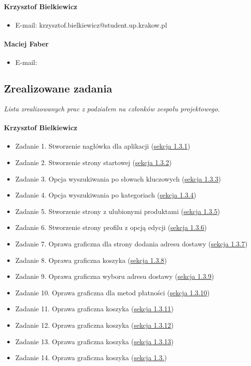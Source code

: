 \documentclass[12pt,a4paper,oneside]{article}
\theoremstyle{definition}
\numberwithin{equation}{section}
\begin{document}
    \paragraph{Krzysztof Bielkiewicz}
    \begin{itemize}
        \item E-mail:  krzysztof.bielkiewicz@student.up.krakow.pl
    \end{itemize}
    \paragraph{Maciej Faber}
    \begin{itemize}
        \item E-mail:
    \end{itemize}

\subsection{Zrealizowane zadania}
\textit{Lista zrealizowanych prac z podziałem na członków zespołu projektowego.}
\paragraph{Krzysztof Bielkiewicz}
\begin{itemize}
\item Zadanie 1. Stworzenie nagłówka dla aplikacji (\hyperref[1.3.1]{sekcja 1.3.1})
\item Zadanie 2. Stworzenie strony startowej (\hyperref[1.3.2]{sekcja 1.3.2})
\item Zadanie 3. Opcja wyszukiwania po słowach kluczowych (\hyperref[1.3.3]{sekcja 1.3.3})
\item Zadanie 4. Opcja wyszukiwania po kategoriach (\hyperref[1.3.4]{sekcja 1.3.4})
\item Zadanie 5. Stworzenie strony z ulubionymi produktami (\hyperref[1.3.5]{sekcja 1.3.5})
\item Zadanie 6. Stworzenie strony profilu z opcją edycji (\hyperref[1.3.6]{sekcja 1.3.6})
\item Zadanie 7. Oprawa graficzna dla strony dodania adresu dostawy (\hyperref[1.3.7]{sekcja 1.3.7})
\item Zadanie 8. Oprawa graficzna koszyka (\hyperref[1.3.8]{sekcja 1.3.8})
\item Zadanie 9. Oprawa graficzna wyboru adresu dostawy (\hyperref[1.3.9]{sekcja 1.3.9})
\item Zadanie 10. Oprawa graficzna dla metod płatności (\hyperref[1.3.10]{sekcja 1.3.10})
\item Zadanie 11. Oprawa graficzna koszyka (\hyperref[1.3.11]{sekcja 1.3.11})
\item Zadanie 12. Oprawa graficzna koszyka (\hyperref[1.3.12]{sekcja 1.3.12})
\item Zadanie 13. Oprawa graficzna koszyka (\hyperref[1.3.13]{sekcja 1.3.13})
\item Zadanie 14. Oprawa graficzna koszyka (\hyperref[1.3.14]{sekcja 1.3.})
\end{itemize}
\end{document}
